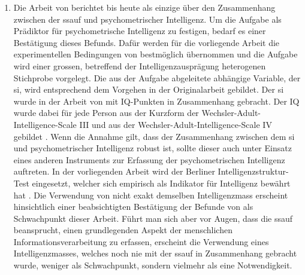 \documentclass[11pt, twoside, a4paper]{book}		%
\begin{document}
\begin{enumerate}
	\item Die Arbeit von \citet{Melnick2013} berichtet bis heute als einzige über den Zusammenhang zwischen der \gls{ssauf} und psychometrischer Intelligenz. Um die Aufgabe als Prädiktor für psychometrische Intelligenz zu festigen, bedarf es einer Bestätigung dieses Befunds. Dafür werden für die vorliegende Arbeit die experimentellen Bedingungen von \citeauthor{Melnick2013} bestmöglich übernommen und die Aufgabe wird einer grossen, betreffend der Intelligenzausprägung heterogenen Stichprobe vorgelegt. Die aus der Aufgabe abgeleitete abhängige Variable, der \gls{si}, wird entsprechend dem Vorgehen in der Originalarbeit gebildet. Der \gls{si} wurde in der Arbeit von \citeauthor{Melnick2013} mit IQ-Punkten in Zusammenhang gebracht. Der IQ wurde dabei für jede Person aus der Kurzform der Wechsler-Adult-Intelligence-Scale III \citep{Axelrod2002} und aus der Wechsler-Adult-In\-tell\-igence-Scale IV \citep{Wechsler2008} gebildet \citep[siehe Studie 1 und 2 bei][]{Melnick2013}. Wenn die Annahme gilt, dass der Zusammenhang zwischen dem \gls{si} und psychometrischer Intelligenz robust ist, sollte dieser auch unter Einsatz eines anderen Instruments zur Erfassung der psychometrischen Intelligenz auftreten. In der  vorliegenden Arbeit wird der Berliner Intelligenzstruktur-Test \citep{Jaeger1997} eingesetzt, welcher sich empirisch als Indikator für Intelligenz bewährt hat \citep{Beauducel2002, Valerius2014}. Die Verwendung von nicht exakt demselben Intelligenzmass erscheint hinsichtlich einer beabsichtigten Bestätigung der Befunde von \citeauthor{Melnick2013} als Schwachpunkt dieser Arbeit. Führt man sich aber vor Augen, dass die \gls{ssauf} beansprucht, einen grundlegenden Aspekt der menschlichen Informationsverarbeitung zu erfassen, erscheint die Verwendung eines Intelligenzmasses, welches noch nie mit der \gls{ssauf} in Zusammenhang gebracht wurde, weniger als Schwachpunkt, sondern vielmehr als eine Notwendigkeit.


\end{enumerate}
\end{document}
